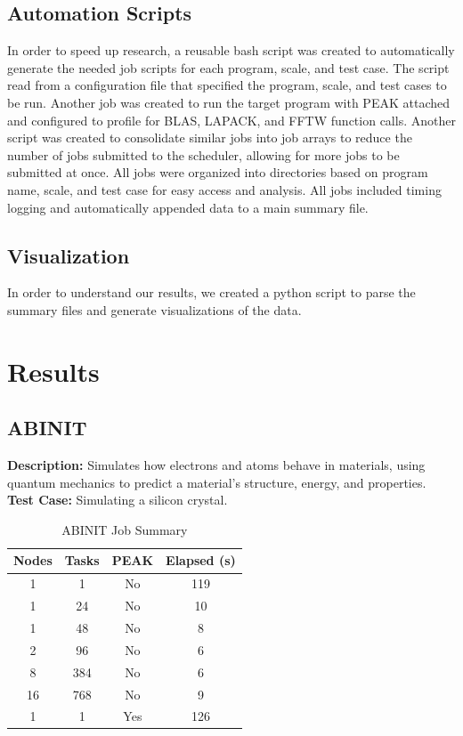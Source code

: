 \documentclass[conference]{IEEEtran}
\begin{document}
\subsection{Automation Scripts}
In order to speed up research, a reusable bash script was created to automatically generate the needed job scripts for each program, scale, and test case. The script read from a configuration file that specified the program, scale, and test cases to be run. Another job was created to run the target program with PEAK attached and configured to profile for BLAS, LAPACK, and FFTW function calls. Another script was created to consolidate similar jobs into job arrays to reduce the number of jobs submitted to the scheduler, allowing for more jobs to be submitted at once. All jobs were organized into directories based on program name, scale, and test case for easy access and analysis. All jobs included timing logging and automatically appended data to a main summary file.

\subsection{Visualization}
In order to understand our results, we created a python script to parse the summary files and generate visualizations of the data.

\section{Results}

\subsection{ABINIT}
\textbf{Description:} Simulates how electrons and atoms behave in materials, using quantum mechanics to predict a material's structure, energy, and properties.\\
\textbf{Test Case:} Simulating a silicon crystal.

\begin{table}[H]
\centering
\caption{ABINIT Job Summary}
\label{tab:abinit-summary}
\scriptsize
\begin{tabular}{c c c c}
\toprule
Nodes & Tasks & PEAK & Elapsed (s) \\
\midrule
1  & 1   & No  & 119 \\
1  & 24  & No  & 10  \\
1  & 48  & No  & 8   \\
2  & 96  & No  & 6   \\
8  & 384 & No  & 6   \\
16 & 768 & No  & 9   \\
1  & 1   & Yes & 126 \\
\bottomrule
\end{tabular}
\end{table}
\end{document}
